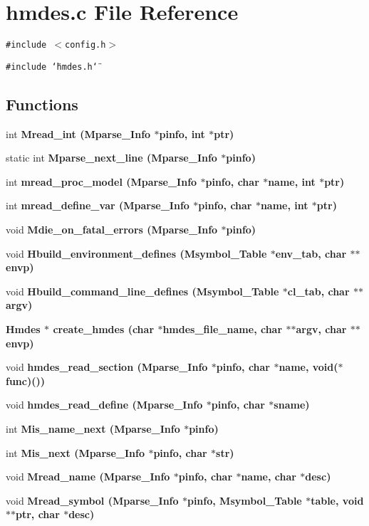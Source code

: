 \section{hmdes.c File Reference}
\label{hmdes_8c}
{\tt \#include $<$config.h$>$}\par
{\tt \#include \char`\"{}hmdes.h\char`\"{}}\par
\subsection*{Functions}
\begin{CompactItemize}
\item 
int \bf{Mread\_\-int} (\bf{Mparse\_\-Info} $\ast$pinfo, int $\ast$ptr)
\item 
static int \bf{Mparse\_\-next\_\-line} (\bf{Mparse\_\-Info} $\ast$pinfo)
\item 
int \bf{mread\_\-proc\_\-model} (\bf{Mparse\_\-Info} $\ast$pinfo, char $\ast$\bf{name}, int $\ast$ptr)
\item 
int \bf{mread\_\-define\_\-var} (\bf{Mparse\_\-Info} $\ast$pinfo, char $\ast$\bf{name}, int $\ast$ptr)
\item 
void \bf{Mdie\_\-on\_\-fatal\_\-errors} (\bf{Mparse\_\-Info} $\ast$pinfo)
\item 
void \bf{Hbuild\_\-environment\_\-defines} (\bf{Msymbol\_\-Table} $\ast$env\_\-tab, char $\ast$$\ast$envp)
\item 
void \bf{Hbuild\_\-command\_\-line\_\-defines} (\bf{Msymbol\_\-Table} $\ast$cl\_\-tab, char $\ast$$\ast$argv)
\item 
\bf{Hmdes} $\ast$ \bf{create\_\-hmdes} (char $\ast$hmdes\_\-file\_\-name, char $\ast$$\ast$argv, char $\ast$$\ast$envp)
\item 
void \bf{hmdes\_\-read\_\-section} (\bf{Mparse\_\-Info} $\ast$pinfo, char $\ast$\bf{name}, void($\ast$func)())
\item 
void \bf{hmdes\_\-read\_\-define} (\bf{Mparse\_\-Info} $\ast$pinfo, char $\ast$sname)
\item 
int \bf{Mis\_\-name\_\-next} (\bf{Mparse\_\-Info} $\ast$pinfo)
\item 
int \bf{Mis\_\-next} (\bf{Mparse\_\-Info} $\ast$pinfo, char $\ast$str)
\item 
void \bf{Mread\_\-name} (\bf{Mparse\_\-Info} $\ast$pinfo, char $\ast$\bf{name}, char $\ast$desc)
\item 
void \bf{Mread\_\-symbol} (\bf{Mparse\_\-Info} $\ast$pinfo, \bf{Msymbol\_\-Table} $\ast$table, void $\ast$$\ast$ptr, char $\ast$desc)
$$
\end{CompactItemize}
